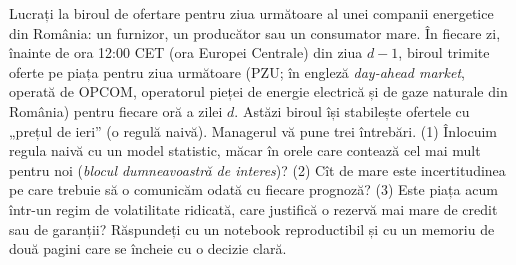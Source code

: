 \begin{scenario}
%
{Lucrați la biroul de ofertare pentru ziua următoare al unei companii energetice din România: un furnizor, un producător sau un consumator mare.
În fiecare zi, înainte de ora 12:00 CET (ora Europei Centrale) din ziua $d-1$, biroul trimite oferte pe piața pentru ziua următoare
(PZU; în engleză \emph{day-ahead market}, operată de OPCOM, operatorul pieței de energie electrică și de gaze naturale din România) pentru fiecare oră a zilei $d$.
Astăzi biroul își stabilește ofertele cu „prețul de ieri'' (o regulă naivă).
Managerul vă pune trei întrebări.
(1) Înlocuim regula naivă cu un model statistic, măcar în orele care contează cel mai mult pentru noi (\emph{blocul dumneavoastră de interes})?
(2) Cît de mare este incertitudinea pe care trebuie să o comunicăm odată cu fiecare prognoză?
(3) Este piața acum într-un regim de volatilitate ridicată, care justifică o rezervă mai mare de credit sau de garanții?
Răspundeți cu un notebook reproductibil și cu un memoriu de două pagini care se încheie cu o decizie clară.}
\end{scenario}

